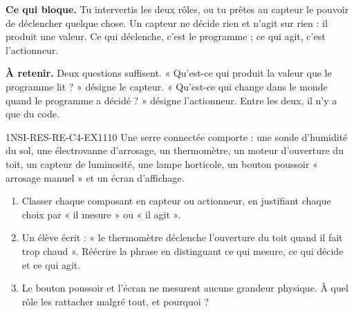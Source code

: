 

\textbf{Ce qui bloque.} Tu intervertis les deux rôles, ou tu prêtes au capteur le pouvoir de
déclencher quelque chose. Un capteur ne décide rien et n'agit sur rien : il produit une
valeur. Ce qui déclenche, c'est le programme ; ce qui agit, c'est l'actionneur.

\textbf{À retenir.} Deux questions suffisent. « Qu'est-ce qui produit la valeur que le
programme lit ? » désigne le capteur. « Qu'est-ce qui change dans le monde quand le
programme a décidé ? » désigne l'actionneur. Entre les deux, il n'y a que du code.

\begin{exercice}{1NSI-RES-RE-C4-EX1}{1}{10}
Une serre connectée comporte : une sonde d'humidité du sol, une électrovanne d'arrosage, un
thermomètre, un moteur d'ouverture du toit, un capteur de luminosité, une lampe horticole, un
bouton poussoir « arrosage manuel » et un écran d'affichage.
\begin{enumerate}
  \item Classer chaque composant en capteur ou actionneur, en justifiant chaque choix par
        « il mesure » ou « il agit ».
  \item Un élève écrit : « le thermomètre déclenche l'ouverture du toit quand il fait trop
        chaud ». Réécrire la phrase en distinguant ce qui mesure, ce qui décide et ce qui
        agit.
  \item Le bouton poussoir et l'écran ne mesurent aucune grandeur physique. À quel rôle les
        rattacher malgré tout, et pourquoi ?
\end{enumerate}
\end{exercice}
